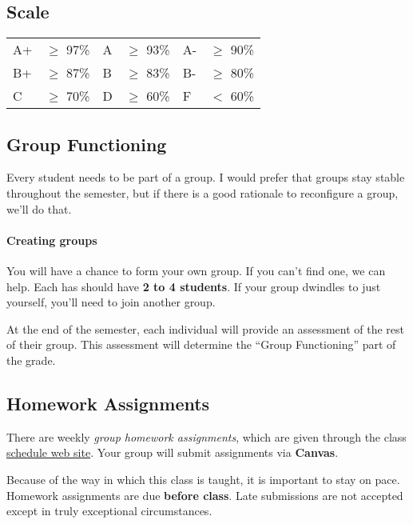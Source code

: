 \documentclass[11pt]{article}
\begin{document}
\subsection{Scale}\label{scale}

\begin{tabular}{llllll}
A+ & $\ge$ 97\% & A & $\ge$  93\% & A- & $\ge$
90\% \\
B+ & $\ge$  87\% & B & $\ge$  83\% & B- & $\ge$
80\% \\
C & $\ge$  70\% & D & $\ge$  60\% & F & $<$
60\% \\
\end{tabular}

\subsection{Group Functioning}\label{group-functioning}

Every student needs to be part of a group. I would prefer that groups
stay stable throughout the semester, but if there is a good rationale to
reconfigure a group, we'll do that.



\paragraph{Creating groups} You will have a chance to form your own group.
If you can't find one, we can help. Each has should have \textbf{2 to 4 students}. If your group dwindles to just yourself, you'll need to join another group.

At the end of the semester, each individual will provide an assessment
of the rest of their group. This assessment will determine the ``Group Functioning'' part of the grade.

\subsection{Homework Assignments}\label{homework-assignments}

There are weekly \emph{group homework assignments}, which are given through the class \href{https://github.com/nguyenthanhvuh/class-oo/wiki/Assignments}{schedule web site}. Your group will submit assignments via \textbf{Canvas}.

Because of the way in which this class is taught, it is important to
stay on pace. Homework assignments are due \textbf{before class}. Late submissions
are not accepted except in truly exceptional circumstances.
\end{document}
